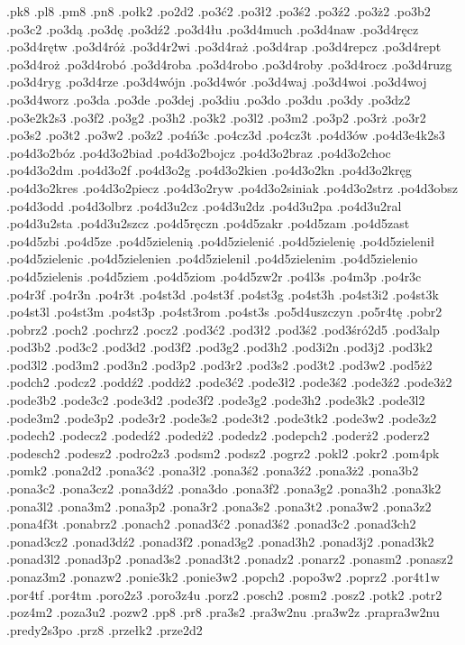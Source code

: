 {.pk8
.pl8
.pm8
.pn8
.połk2
.po2d2
.po3ć2
.po3ł2
.po3ś2
.po3ź2
.po3ż2
.po3b2
.po3c2
.po3dą
.po3dę
.po3dź2
.po3d4łu
.po3d4much
.po3d4naw
.po3d4ręcz
.po3d4rętw
.po3d4róż
.po3d4r2wi
.po3d4raż
.po3d4rap
.po3d4repcz
.po3d4rept
.po3d4roż
.po3d4robó
.po3d4roba
.po3d4robo
.po3d4roby
.po3d4rocz
.po3d4ruzg
.po3d4ryg
.po3d4rze
.po3d4wójn
.po3d4wór
.po3d4waj
.po3d4woi
.po3d4woj
.po3d4worz
.po3da
.po3de
.po3dej
.po3diu
.po3do
.po3du
.po3dy
.po3dz2
.po3e2k2s3
.po3f2
.po3g2
.po3h2
.po3k2
.po3l2
.po3m2
.po3p2
.po3rż
.po3r2
.po3s2
.po3t2
.po3w2
.po3z2
.po4ń3c
.po4cz3d
.po4cz3t
.po4d3ów
.po4d3e4k2s3
.po4d3o2bóz
.po4d3o2biad
.po4d3o2bojcz
.po4d3o2braz
.po4d3o2choc
.po4d3o2dm
.po4d3o2f
.po4d3o2g
.po4d3o2kien
.po4d3o2kn
.po4d3o2kręg
.po4d3o2kres
.po4d3o2piecz
.po4d3o2ryw
.po4d3o2siniak
.po4d3o2strz
.po4d3obsz
.po4d3odd
.po4d3olbrz
.po4d3u2cz
.po4d3u2dz
.po4d3u2pa
.po4d3u2ral
.po4d3u2sta
.po4d3u2szcz
.po4d5ręczn
.po4d5zakr
.po4d5zam
.po4d5zast
.po4d5zbi
.po4d5ze
.po4d5zielenią
.po4d5zielenić
.po4d5zielenię
.po4d5zielenił
.po4d5zielenic
.po4d5zielenien
.po4d5zielenil
.po4d5zielenim
.po4d5zielenio
.po4d5zielenis
.po4d5ziem
.po4d5ziom
.po4d5zw2r
.po4l3s
.po4m3p
.po4r3c
.po4r3f
.po4r3n
.po4r3t
.po4st3d
.po4st3f
.po4st3g
.po4st3h
.po4st3i2
.po4st3k
.po4st3l
.po4st3m
.po4st3p
.po4st3rom
.po4st3s
.po5d4uszczyn
.po5r4tę
.pobr2
.pobrz2
.poch2
.pochrz2
.pocz2
.pod3ć2
.pod3ł2
.pod3ś2
.pod3śró2d5
.pod3alp
.pod3b2
.pod3c2
.pod3d2
.pod3f2
.pod3g2
.pod3h2
.pod3i2n
.pod3j2
.pod3k2
.pod3l2
.pod3m2
.pod3n2
.pod3p2
.pod3r2
.pod3s2
.pod3t2
.pod3w2
.pod5ż2
.podch2
.podcz2
.poddź2
.poddż2
.pode3ć2
.pode3ł2
.pode3ś2
.pode3ź2
.pode3ż2
.pode3b2
.pode3c2
.pode3d2
.pode3f2
.pode3g2
.pode3h2
.pode3k2
.pode3l2
.pode3m2
.pode3p2
.pode3r2
.pode3s2
.pode3t2
.pode3tk2
.pode3w2
.pode3z2
.podech2
.podecz2
.podedź2
.podedż2
.podedz2
.podepch2
.poderż2
.poderz2
.podesch2
.podesz2
.podro2z3
.podsm2
.podsz2
.pogrz2
.pokl2
.pokr2
.pom4pk
.pomk2
.pona2d2
.pona3ć2
.pona3ł2
.pona3ś2
.pona3ź2
.pona3ż2
.pona3b2
.pona3c2
.pona3cz2
.pona3dź2
.pona3do
.pona3f2
.pona3g2
.pona3h2
.pona3k2
.pona3l2
.pona3m2
.pona3p2
.pona3r2
.pona3s2
.pona3t2
.pona3w2
.pona3z2
.pona4f3t
.ponabrz2
.ponach2
.ponad3ć2
.ponad3ś2
.ponad3c2
.ponad3ch2
.ponad3cz2
.ponad3dź2
.ponad3f2
.ponad3g2
.ponad3h2
.ponad3j2
.ponad3k2
.ponad3l2
.ponad3p2
.ponad3s2
.ponad3t2
.ponadz2
.ponarz2
.ponasm2
.ponasz2
.ponaz3m2
.ponazw2
.ponie3k2
.ponie3w2
.popch2
.popo3w2
.poprz2
.por4t1w
.por4tf
.por4tm
.poro2z3
.poro3z4u
.porz2
.posch2
.posm2
.posz2
.potk2
.potr2
.poz4m2
.poza3u2
.pozw2
.pp8
.pr8
.pra3s2
.pra3w2nu
.pra3w2z
.prapra3w2nu
.predy2s3po
.prz8
.przełk2
.prze2d2
}
